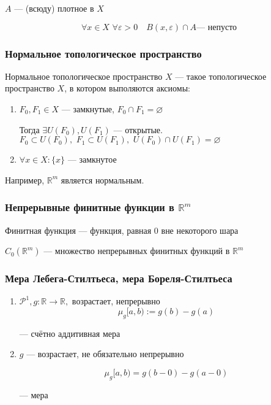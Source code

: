 \documentclass{article}
\def\dbl{\,\,}
\begin{document}
$A$ --- (всюду) плотное в $X$

\[\forall x \in X \dbl \forall \varepsilon > 0 \quad B(x, \varepsilon) \cap A\text{--- непусто}\]

\subsubsection{Нормальное топологическое пространство}

Нормальное топологическое пространство $X$ --- такое топологическое пространство $X$, в котором выполяются аксиомы:

\begin{enumerate}
    \item $F_0, F_1 \in X$ --- замкнутые, $F_0 \cap F_1 = \varnothing$
    
    Тогда $\exists U(F_0), U(F_1)$ --- открытые. $F_0 \subset U(F_0), \dbl F_1 \subset U(F_1), \dbl U(F_0) \cap U(F_1) = \varnothing$

    \item $\forall x \in X: \{x\}$ --- замкнутое
\end{enumerate}

Например, $\mathbb{R}^m$ является нормальным.

\subsubsection{Непрерывные финитные функции в $\mathbb{R}^m$}

Финитная функция --- функция, равная 0 вне некоторого шара

$C_0(\mathbb{R}^m)$ --- множество непрерывных финитных функций в $\mathbb{R}^m$

\subsubsection{Мера Лебега-Стилтьеса, мера Бореля-Стилтьеса}

\begin{enumerate}
    \item $\mathcal{P}^{1}, g: \mathbb{R} \rightarrow \mathbb{R}, $ возрастает, непрерывно
    \[\mu_g[a, b) := g(b) - g(a)\]

    --- счётно аддитивная мера
    \item $g$ --- возрастает, не обязательно непрерывно
    
    \[\mu_g[a, b) = g(b - 0) - g(a - 0)\]

    --- мера
\end{enumerate}
\end{document}
